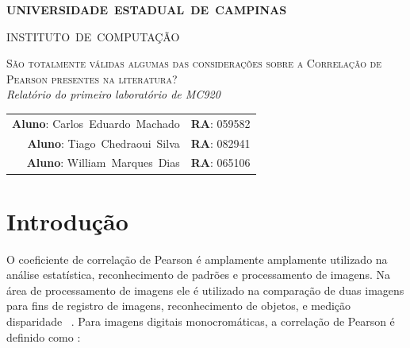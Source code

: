 \documentclass[10pt,a4paper]{article}
\begin{document}
\begin{titlepage}
\thispagestyle{empty}
  \begin{center} {\large \textbf{UNIVERSIDADE~ESTADUAL~DE~CAMPINAS}} \end{center}
  \begin{center} {\large INSTITUTO~DE~COMPUTAÇÃO}                    \end{center}
  \vspace{0.1cm}
  \begin{center}
  \begin{minipage}[tl]{31mm}
  \end{minipage}
  \end{center}
  \vspace{0.3cm}
  \begin{center} 
    {\large \textsc{São totalmente válidas algumas das considerações sobre a
Correlação de Pearson presentes na literatura?  }} 
    \\\vspace{0.5cm}
    {\textsl{Relatório do primeiro laboratório de MC920}}
    \\\vspace{1cm}
    \begin{tabular}{rl}
	  \textbf{Aluno}:   Carlos~Eduardo~Machado &  
	  \textbf{RA}:          059582 \\ 
	  \textbf{Aluno}:        Tiago~Chedraoui~Silva & 
	  \textbf{RA}:        082941 \\
	  \textbf{Aluno}:        William~Marques~Dias & 
	  \textbf{RA}:        065106 \\
	\end{tabular}
  \end{center}
  \vspace{0.5cm}

  \begin{abstract}
O coeficiente de correlação de Pearson é amplamente usado para
comparar imagens, contudo ele apresenta sérias limitações. Esse
trabalho consistiu na validação da análise realizada no Artigo ''The
Ineffectiveness of the Correlation Coefficient for Image Comparisons''.
  \end{abstract}
  \tableofcontents
\end{titlepage} 

\vspace{2mm}
\newpage

\section{Introdução}
O coeficiente de correlação de Pearson é amplamente amplamente
utilizado na análise estatística, reconhecimento de padrões e
processamento de imagens.
Na área de processamento de imagens ele é utilizado na comparação de
duas imagens para fins de registro de imagens, reconhecimento de
objetos, e medição disparidade ~\cite{paper}. Para imagens digitais monocromáticas, a correlação de Pearson é definido como :
\end{document}
